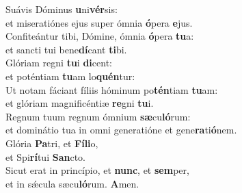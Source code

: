 \evenverse Suávis Dóminus \textbf{u}ni\textbf{vér}sis:~\*\\
\evenverse et miseratiónes ejus super ómnia \textbf{ó}pera \textbf{e}jus.\\
\oddverse Confiteántur tibi, Dómine, ómnia \textbf{ó}pera \textbf{tu}a:~\*\\
\oddverse et sancti tui bene\textbf{dí}cant \textbf{ti}bi.\\
\evenverse Glóriam regni \textbf{tu}i \textbf{di}cent:~\*\\
\evenverse et poténtiam \textbf{tu}am lo\textbf{quén}tur:\\
\oddverse Ut notam fáciant fíliis hóminum po\textbf{tén}tiam \textbf{tu}am:~\*\\
\oddverse et glóriam magnificéntiæ \textbf{re}gni \textbf{tu}i.\\
\evenverse Regnum tuum regnum ómnium \textbf{sæ}cu\textbf{ló}rum:~\*\\
\evenverse et dominátio tua in omni generatióne et gene\textbf{ra}ti\textbf{ó}nem.\\
\oddverse Glória \textbf{Pa}tri, et \textbf{Fí}\textbf{li}o,~\*\\
\oddverse et Spi\textbf{rí}tui \textbf{San}cto.\\
\evenverse Sicut erat in princípio, et \textbf{nunc}, et \textbf{sem}per,~\*\\
\evenverse et in sǽcula sæcu\textbf{ló}rum. \textbf{A}men.\\
